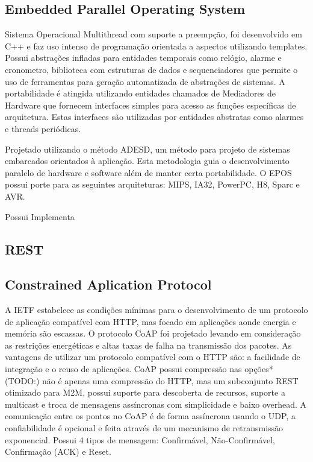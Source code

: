 \subsection{Embedded Parallel Operating System}
Sistema Operacional Multithread com suporte a preempção, foi desenvolvido em C++ e faz uso intenso de programação orientada a aspectos utilizando templates.
Possui abstrações infladas para entidades temporais como relógio, alarme e cronometro, biblioteca com estruturas de dados e sequenciadores que permite o uso de ferramentas para geração automatizada de abstrações de sistemas. A portabilidade é atingida utilizando entidades chamados de Mediadores de Hardware que fornecem interfaces simples para acesso as funções específicas de arquitetura. Estas interfaces são utilizadas por entidades abstratas como alarmes e threads periódicas.

Projetado utilizando o método ADESD, um método para projeto de sistemas embarcados orientados à aplicação. Esta metodologia guia o desenvolvimento paralelo de hardware e software além de manter certa portabilidade. O EPOS possui porte para as seguintes arquiteturas: MIPS, IA32, PowerPC, H8, Sparc e AVR.

Possui Implementa


\cite{epos}


\subsection{REST}

\subsection{Constrained Aplication Protocol}

A IETF estabelece as condições mínimas para o desenvolvimento de um protocolo de aplicação compatível com HTTP, mas focado em aplicações aonde energia e memória são escassas. O protocolo CoAP foi projetado levando em consideração as restrições energéticas e altas taxas de falha na transmissão dos pacotes. As vantagens de utilizar um protocolo compatível com o HTTP são: a facilidade de integração e o reuso de aplicações. CoAP possui compressão nas opções* (TODO:) não é apenas uma compressão do HTTP, mas um subconjunto REST otimizado para M2M, possui suporte para descoberta de recursos, suporte a multicast e troca de mensagens assíncronas com simplicidade e baixo overhead. A comunicação entre os pontos no CoAP é de forma assíncrona usando o UDP, a confiabilidade é opcional e feita através de um mecanismo de retransmissão exponencial. Possui 4 tipos de mensagem: Confirmável, Não-Confirmável, Confirmação (ACK) e Reset.


